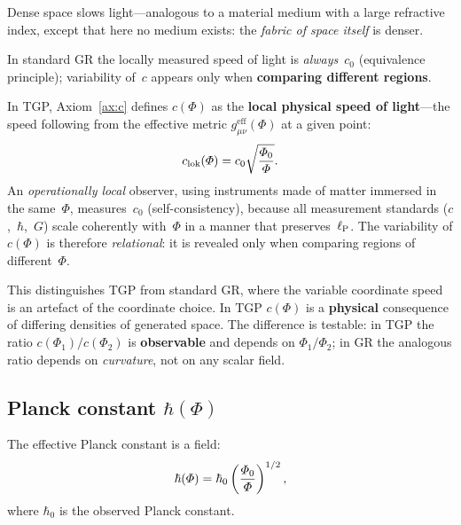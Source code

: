 Dense space slows light---analogous to a material medium with
a large refractive index, except that here no medium exists:
the \emph{fabric of space itself} is denser.

\begin{remark}\label{rem:c-interpretacja}
In standard GR the locally measured speed of light is
\emph{always}~$c_0$ (equivalence principle); variability of~$c$
appears only when \textbf{comparing different regions}.

In TGP, Axiom~\ref{ax:c} defines $c(\Phi)$ as the
\textbf{local physical speed of light}---the speed following
from the effective metric
$g_{\mu\nu}^{\mathrm{eff}}(\Phi)$ at a given point:
\begin{equation}\label{eq:c-lok}
    c_{\mathrm{lok}}(\varPhi)
    = c_0\sqrt{\frac{\varPhi_0}{\varPhi}}.
\end{equation}
An \emph{operationally local} observer, using instruments
made of matter immersed in the same~$\Phi$, measures~$c_0$
(self-consistency), because all measurement standards
($c$,~$\hbar$,~$G$) scale coherently with~$\Phi$
in a manner that preserves~$\ell_{\mathrm{P}}$.
The variability of $c(\Phi)$ is therefore \emph{relational}:
it is revealed only when comparing regions of different~$\Phi$.

This distinguishes TGP from standard GR, where the variable
coordinate speed is an artefact of the coordinate choice.
In TGP $c(\Phi)$ is a \textbf{physical} consequence of
differing densities of generated space.  The difference is
testable: in TGP the ratio $c(\Phi_1)/c(\Phi_2)$ is
\textbf{observable} and depends on $\Phi_1/\Phi_2$;
in GR the analogous ratio depends on \emph{curvature},
not on any scalar field.
\end{remark}

\subsection{Planck constant $\hbar(\Phi)$}\label{ssec:hbar}

\begin{axiom}\label{ax:hbar}
The effective Planck constant is a field:
\begin{equation}\label{eq:hbarPhi}
    \hbar(\varPhi) = \hbar_0 \left(\frac{\varPhi_0}{\varPhi}\right)^{1/2},
\end{equation}
where $\hbar_0$ is the observed Planck constant.
\end{axiom}

